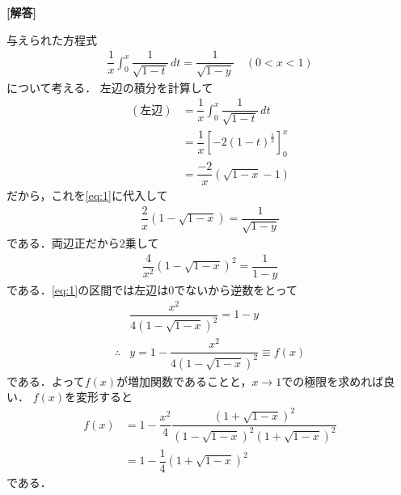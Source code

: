 \documentclass[../../main.tex]{subfiles}
\begin{document}
\begin{oframed}
  
\end{oframed}

{\bf [解答]}

与えられた方程式
\begin{align}
  \dfrac{1}{x} \int_0^x \dfrac{1}{\sqrt{1-t}} \, dt = \dfrac{1}{\sqrt{1-y}}
  \quad (0<x<1) \label{eq:1}
\end{align}
について考える．
左辺の積分を計算して
\begin{align}
  (\text{左辺})
  &=  \dfrac{1}{x} \int_0^x \dfrac{1}{\sqrt{1-t}} \, dt \\
  &= \dfrac{1}{x} \left[ -2(1-t)^{\frac{1}{2}} \right]_0^x \\
  &= \dfrac{-2}{x} \left(\sqrt{1-x} - 1\right)
\end{align}
だから，これを\cref{eq:1}に代入して
\begin{align}
  \dfrac{2}{x} \left(1 - \sqrt{1-x}\right) = \dfrac{1}{\sqrt{1-y}}
\end{align}
である．両辺正だから2乗して
\begin{align}
  \dfrac{4}{x^2} \left(1 - \sqrt{1-x}\right)^2 = \dfrac{1}{1-y}
\end{align}
である．\cref{eq:1}の区間では左辺は$0$でないから逆数をとって
\begin{align}
  & \dfrac{x^2}{4\left(1 - \sqrt{1-x}\right)^2} = 1 - y \\
  \therefore
  &y = 1 - \dfrac{x^2}{4\left(1 - \sqrt{1-x}\right)^2} \equiv f(x) \label{eq:2}
\end{align}
である．よって$f(x)$が増加関数であることと，$x\to 1$での極限を求めれば良い．
$f(x)$を変形すると
\begin{align}
  f(x)
  &= 1 - \dfrac{x^2}{4}\dfrac{\left(1 + \sqrt{1-x}\right)^2}{\left(1 - \sqrt{1-x}\right)^2\left(1 + \sqrt{1-x}\right)^2} \\
  &= 1 - \dfrac{1}{4}\left(1 + \sqrt{1-x}\right)^2 \label{eq:3}
\end{align}
である．
\end{document}
